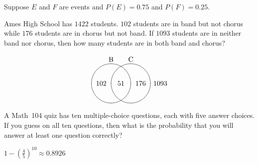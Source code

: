 \documentclass[answers,addpoints,12pt]{exam}
\begin{document}
\begin{questions}
\question[15] Suppose $E$ and $F$ are events
and $P\left(E\right)=0.75$ and $P\left(F\right)=0.25$.
\begin{solution}
\end{solution}

\question[12] Ames High School has $1422$ students.
$102$ students are in band but not chorus while
$176$ students are in chorus but not band.
If $1093$ students are in neither band nor chorus,
then how many students are in both band and chorus?
\begin{solution}
\[\begin{xy}<.5cm,0cm>:
(-1,2)*+!D{\text{B}};
(1,2)*+!D{\text{C}};
(-1,0)*\cir<1cm>{};
(1,0)*\cir<1cm>{};
(0,0)*{51};
(-2,0)*{102};
(2,0)*{176};
(4,0)*{1093};
\end{xy}\]
\end{solution}

\question[12] A Math~104 quiz has ten multiple-choice
questions, each with five answer choices. If you guess on all
ten questions, then what is the probability that you will answer at
least one question correctly?
\begin{solution}
$1-\left(\frac{4}{5}\right)^{10}\approx 0.8926$
\end{solution}

\end{questions}

\vfill\ifprintanswers\else
\begin{center}\gradetable[h][questions]\end{center}\fi
\end{document}
